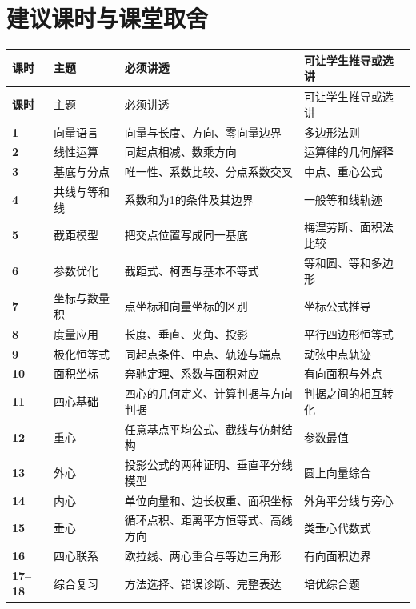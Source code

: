 \documentclass[11pt,a4paper,openany]{ctexbook}
\begin{document}
\section{建议课时与课堂取舍}
\begin{longtable}{>{\bfseries}p{1.2cm}p{3.0cm}p{5.2cm}p{4.2cm}}
\toprule
课时 & 主题 & 必须讲透 & 可让学生推导或选讲\\
\midrule
\endfirsthead
\toprule
课时 & 主题 & 必须讲透 & 可让学生推导或选讲\\
\midrule
\endhead
1 & 向量语言 & 向量与长度、方向、零向量边界 & 多边形法则\\
2 & 线性运算 & 同起点相减、数乘方向 & 运算律的几何解释\\
3 & 基底与分点 & 唯一性、系数比较、分点系数交叉 & 中点、重心公式\\
4 & 共线与等和线 & 系数和为1的条件及其边界 & 一般等和线轨迹\\
5 & 截距模型 & 把交点位置写成同一基底 & 梅涅劳斯、面积法比较\\
6 & 参数优化 & 截距式、柯西与基本不等式 & 等和圆、等和多边形\\
7 & 坐标与数量积 & 点坐标和向量坐标的区别 & 坐标公式推导\\
8 & 度量应用 & 长度、垂直、夹角、投影 & 平行四边形恒等式\\
9 & 极化恒等式 & 同起点条件、中点、轨迹与端点 & 动弦中点轨迹\\
10 & 面积坐标 & 奔驰定理、系数与面积对应 & 有向面积与外点\\
11 & 四心基础 & 四心的几何定义、计算判据与方向判据 & 判据之间的相互转化\\
12 & 重心 & 任意基点平均公式、截线与仿射结构 & 参数最值\\
13 & 外心 & 投影公式的两种证明、垂直平分线模型 & 圆上向量综合\\
14 & 内心 & 单位向量和、边长权重、面积坐标 & 外角平分线与旁心\\
15 & 垂心 & 循环点积、距离平方恒等式、高线方向 & 类垂心代数式\\
16 & 四心联系 & 欧拉线、两心重合与等边三角形 & 有向面积边界\\
17--18 & 综合复习 & 方法选择、错误诊断、完整表达 & 培优综合题\\
\bottomrule
\end{longtable}
\end{document}

